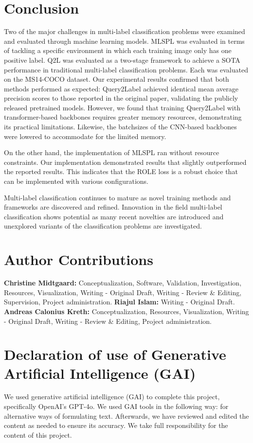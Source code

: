 \documentclass[lettersize,journal]{IEEEtran}
\begin{document}

\section{Conclusion}
Two of the major challenges in multi-label classification problems were examined and evaluated through machine learning models. MLSPL was evaluated in terms of tackling a specific environment in which each training image only has one positive label. Q2L was evaluated as a two-stage framework to achieve a SOTA performance in traditional multi-label classification problems. Each was evaluated on the MS14-COCO dataset. 
Our experimental results confirmed that both methods performed as expected: Query2Label achieved identical mean average precision scores to those reported in the original paper, validating the publicly released pretrained models. However, we found that training Query2Label with transformer-based backbones requires greater memory resources, demonstrating its practical limitations. Likewise, the batchsizes of the CNN-based backbones were lowered to accommodate for the limited memory.

On the other hand, the implementation of MLSPL ran without resource constraints. Our implementation demonstrated results that slightly outperformed the reported results. This indicates that the ROLE loss is a robust choice that can be implemented with various configurations. 

Multi-label classification continues to mature as novel training methods and frameworks are discovered and refined.  Innovation in the field multi-label classification shows potential as many recent novelties are introduced and unexplored variants of the classification problems are investigated. 

\appendices
\section{Author Contributions}

\noindent \textbf{Christine Midtgaard:} Conceptualization, Software, Validation, Investigation, Resources, Visualization, Writing - Original Draft, Writing - Review \& Editing, Supervision, Project administration. \textbf{Riajul Islam:} Writing - Original Draft. \textbf{Andreas Calonius Kreth:} Conceptualization, Resources, Visualization, Writing - Original Draft, Writing - Review \& Editing, Project administration.

\section{Declaration of use of Generative Artificial Intelligence (GAI)}
\noindent We used generative artificial intelligence (GAI) to complete this project, specifically OpenAI's GPT-4o. We used GAI tools in the following way: for alternative ways of formulating text. Afterwards, we have reviewed and edited the content as needed to ensure its accuracy. We take full responsibility for the content of this project. 



\end{document}
